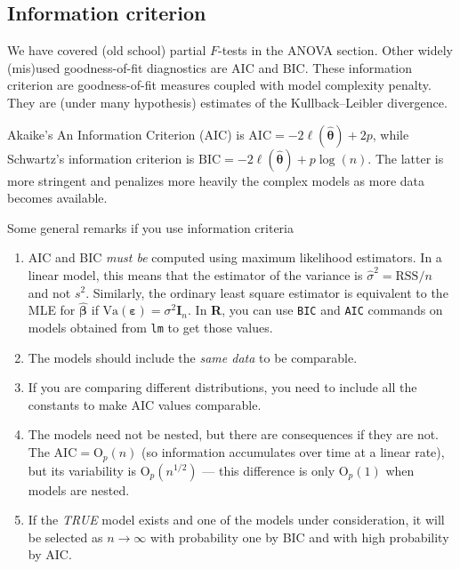 \documentclass[]{book}
\providecommand{\tightlist}{%
  \setlength{\itemsep}{0pt}\setlength{\parskip}{0pt}}
\theoremstyle{definition}
\theoremstyle{definition}
\theoremstyle{definition}
\theoremstyle{remark}
\begin{document}
\hypertarget{information-criterion}{%
\subsection{Information criterion}\label{information-criterion}}

We have covered (old school) partial \(F\)-tests in the ANOVA section.
Other widely (mis)used goodness-of-fit diagnostics are AIC and BIC.
These information criterion are goodness-of-fit measures coupled with
model complexity penalty. They are (under many hypothesis) estimates of
the Kullback--Leibler divergence.

Akaike's An Information Criterion (AIC) is
\(\mathrm{AIC}=-2\ell(\hat{\boldsymbol{\theta}}) + 2p\), while
Schwartz's information criterion is
\(\mathrm{BIC}=-2\ell(\hat{\boldsymbol{\theta}}) + p \log(n)\). The
latter is more stringent and penalizes more heavily the complex models
as more data becomes available.

Some general remarks if you use information criteria

\begin{enumerate}
\def\labelenumi{\arabic{enumi}.}
\tightlist
\item
  AIC and BIC \emph{must be} computed using maximum likelihood
  estimators. In a linear model, this means that the estimator of the
  variance is \(\hat{\sigma}^2=\mathrm{RSS}/n\) and not \(s^2\).
  Similarly, the ordinary least square estimator is equivalent to the
  MLE for \(\hat{\boldsymbol{\beta}}\) if
  \(\mathrm{Va}({\boldsymbol{\varepsilon}}) = \sigma^2 \mathbf{I}_n\).
  In \textbf{R}, you can use \texttt{BIC} and \texttt{AIC} commands on
  models obtained from \texttt{lm} to get those values.
\item
  The models should include the \emph{same data} to be comparable.
\item
  If you are comparing different distributions, you need to include all
  the constants to make AIC values comparable.
\item
  The models need not be nested, but there are consequences if they are
  not. The \(\mathrm{AIC}= \mathrm{O}_p(n)\) (so information accumulates
  over time at a linear rate), but its variability is
  \(\mathrm{O}_p(n^{1/2})\) --- this difference is only
  \(\mathrm{O}_p(1)\) when models are nested.
\item
  If the \emph{TRUE} model exists and one of the models under
  consideration, it will be selected as \(n \to \infty\) with
  probability one by BIC and with high probability by AIC.
\end{enumerate}
\end{document}
